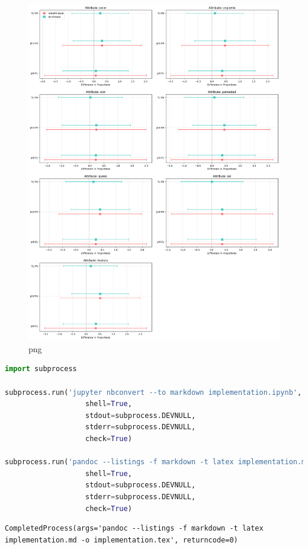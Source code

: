 \begin{figure}
\centering
\includegraphics{implementation_files/implementation_13_1.png}
\caption{png}
\end{figure}

\begin{lstlisting}[language=Python]
import subprocess

subprocess.run('jupyter nbconvert --to markdown implementation.ipynb', 
                   shell=True, 
                   stdout=subprocess.DEVNULL, 
                   stderr=subprocess.DEVNULL, 
                   check=True)

subprocess.run('pandoc --listings -f markdown -t latex implementation.md -o implementation.tex', 
                   shell=True, 
                   stdout=subprocess.DEVNULL, 
                   stderr=subprocess.DEVNULL, 
                   check=True)
\end{lstlisting}

\begin{lstlisting}
CompletedProcess(args='pandoc --listings -f markdown -t latex implementation.md -o implementation.tex', returncode=0)
\end{lstlisting}
